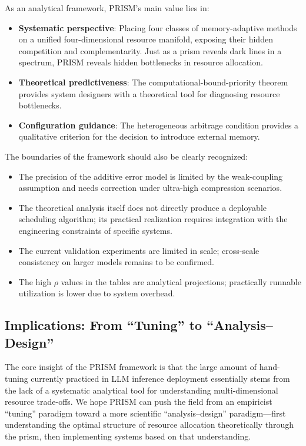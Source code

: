 \documentclass[11pt,a4paper]{article}
\theoremstyle{plain}
\theoremstyle{definition}
\begin{document}
As an analytical framework, PRISM's main value lies in:
\begin{itemize}
    \item \textbf{Systematic perspective}: Placing four classes of memory-adaptive methods on a unified four-dimensional resource manifold, exposing their hidden competition and complementarity. Just as a prism reveals dark lines in a spectrum, PRISM reveals hidden bottlenecks in resource allocation.
    \item \textbf{Theoretical predictiveness}: The computational-bound-priority theorem provides system designers with a theoretical tool for diagnosing resource bottlenecks.
    \item \textbf{Configuration guidance}: The heterogeneous arbitrage condition provides a qualitative criterion for the decision to introduce external memory.
\end{itemize}

The boundaries of the framework should also be clearly recognized:
\begin{itemize}
    \item The precision of the additive error model is limited by the weak-coupling assumption and needs correction under ultra-high compression scenarios.
    \item The theoretical analysis itself does not directly produce a deployable scheduling algorithm; its practical realization requires integration with the engineering constraints of specific systems.
    \item The current validation experiments are limited in scale; cross-scale consistency on larger models remains to be confirmed.
    \item The high $\rho$ values in the tables are analytical projections; practically runnable utilization is lower due to system overhead.
\end{itemize}

\subsection{Implications: From ``Tuning'' to ``Analysis--Design''}

The core insight of the PRISM framework is that the large amount of hand-tuning currently practiced in LLM inference deployment essentially stems from the lack of a systematic analytical tool for understanding multi-dimensional resource trade-offs. We hope PRISM can push the field from an empiricist ``tuning'' paradigm toward a more scientific ``analysis--design'' paradigm---first understanding the optimal structure of resource allocation theoretically through the prism, then implementing systems based on that understanding.
\end{document}
